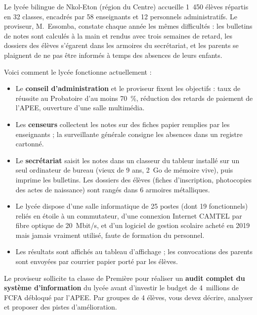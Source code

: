 \documentclass[11pt]{article}
\begin{document}
\begin{exemplebox}
Le lycée bilingue de Nkol-Eton (région du Centre) accueille 1~450 élèves répartis en 32 classes, encadrés par 58 enseignants et 12 personnels administratifs. Le proviseur, M.~Essomba, constate chaque année les mêmes difficultés : les bulletins de notes sont calculés à la main et rendus avec trois semaines de retard, les dossiers des élèves s'égarent dans les armoires du secrétariat, et les parents se plaignent de ne pas être informés à temps des absences de leurs enfants.

Voici comment le lycée fonctionne actuellement :

\begin{itemize}
  \item Le \textbf{conseil d'administration} et le proviseur fixent les objectifs : taux de réussite au Probatoire d'au moins 70~\%, réduction des retards de paiement de l'APEE, ouverture d'une salle multimédia.
  \item Les \textbf{censeurs} collectent les notes sur des fiches papier remplies par les enseignants ; la surveillante générale consigne les absences dans un registre cartonné.
  \item Le \textbf{secrétariat} saisit les notes dans un classeur du tableur installé sur un seul ordinateur de bureau (vieux de 9 ans, \SI{2}{Go} de mémoire vive), puis imprime les bulletins. Les dossiers des élèves (fiches d'inscription, photocopies des actes de naissance) sont rangés dans 6 armoires métalliques.
  \item Le lycée dispose d'une salle informatique de 25 postes (dont 19 fonctionnels) reliés en étoile à un commutateur, d'une connexion Internet CAMTEL par fibre optique de \SI{20}{Mbit/s}, et d'un logiciel de gestion scolaire acheté en 2019 mais jamais vraiment utilisé, faute de formation du personnel.
  \item Les résultats sont affichés au tableau d'affichage ; les convocations des parents sont envoyées par courrier papier porté par les élèves.
\end{itemize}

Le proviseur sollicite ta classe de Première pour réaliser un \textbf{audit complet du système d'information} du lycée avant d'investir le budget de 4~millions de FCFA débloqué par l'APEE. Par groupes de 4 élèves, vous devez décrire, analyser et proposer des pistes d'amélioration.
\end{exemplebox}
\end{document}

